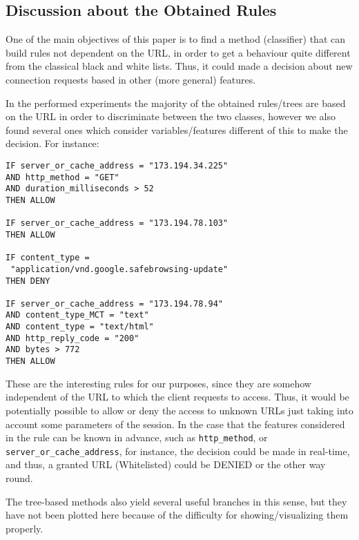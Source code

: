 \documentclass{llncs}
\begin{document}
%
\subsection{Discussion about the Obtained Rules}
\label{sec:rulesdiscussion}

One of the main objectives of this paper is to find a method (classifier) that can build rules not dependent on the URL, in order to get a behaviour quite different from the classical black and white lists. Thus, it could made a decision about new connection requests based in other (more general) features.

In the performed experiments the majority of the obtained rules/trees are based on the URL in order to discriminate between the two classes, however we also found several ones which consider variables/features different of this to make the decision. For instance:\\

\begin{small}
\begin{verbatim}
IF server_or_cache_address = "173.194.34.225"
AND http_method = "GET"
AND duration_milliseconds > 52
THEN ALLOW

IF server_or_cache_address = "173.194.78.103" 
THEN ALLOW

IF content_type = 
 "application/vnd.google.safebrowsing-update" 
THEN DENY

IF server_or_cache_address = "173.194.78.94" 
AND content_type_MCT = "text"
AND content_type = "text/html"
AND http_reply_code = "200"
AND bytes > 772
THEN ALLOW
\end{verbatim}
\end{small}

These are the interesting rules for our purposes, since they are somehow independent of the URL to which the client requests to access. Thus, it would be potentially possible to allow or deny the access to unknown URLs just taking into account some parameters of the session.
In the case that the features considered in the rule can be known in advance, such as \texttt{http\_method}, or \texttt{server\_or\_cache\_address}, for instance, the decision could be made in real-time, and thus, a granted URL (Whitelisted) could be DENIED or the other way round.

The tree-based methods also yield several useful branches in this sense, but they have not been plotted here because of the difficulty for showing/visualizing them properly.
\end{document}
